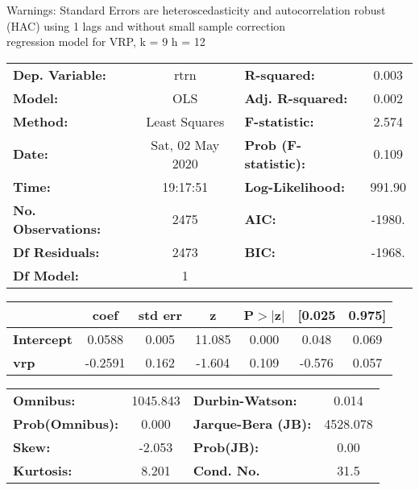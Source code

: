 Warnings: \newline
 [1] Standard Errors are heteroscedasticity and autocorrelation robust (HAC) using 1 lags and without small sample correction\\ 

regression model for VRP, k = 9 h = 12\begin{center}
\begin{tabular}{lclc}
\toprule
\textbf{Dep. Variable:}    &       rtrn       & \textbf{  R-squared:         } &     0.003   \\
\textbf{Model:}            &       OLS        & \textbf{  Adj. R-squared:    } &     0.002   \\
\textbf{Method:}           &  Least Squares   & \textbf{  F-statistic:       } &     2.574   \\
\textbf{Date:}             & Sat, 02 May 2020 & \textbf{  Prob (F-statistic):} &    0.109    \\
\textbf{Time:}             &     19:17:51     & \textbf{  Log-Likelihood:    } &    991.90   \\
\textbf{No. Observations:} &        2475      & \textbf{  AIC:               } &    -1980.   \\
\textbf{Df Residuals:}     &        2473      & \textbf{  BIC:               } &    -1968.   \\
\textbf{Df Model:}         &           1      & \textbf{                     } &             \\
\bottomrule
\end{tabular}
\begin{tabular}{lcccccc}
                   & \textbf{coef} & \textbf{std err} & \textbf{z} & \textbf{P$> |$z$|$} & \textbf{[0.025} & \textbf{0.975]}  \\
\midrule
\textbf{Intercept} &       0.0588  &        0.005     &    11.085  &         0.000        &        0.048    &        0.069     \\
\textbf{vrp}       &      -0.2591  &        0.162     &    -1.604  &         0.109        &       -0.576    &        0.057     \\
\bottomrule
\end{tabular}
\begin{tabular}{lclc}
\textbf{Omnibus:}       & 1045.843 & \textbf{  Durbin-Watson:     } &    0.014  \\
\textbf{Prob(Omnibus):} &   0.000  & \textbf{  Jarque-Bera (JB):  } & 4528.078  \\
\textbf{Skew:}          &  -2.053  & \textbf{  Prob(JB):          } &     0.00  \\
\textbf{Kurtosis:}      &   8.201  & \textbf{  Cond. No.          } &     31.5  \\
\bottomrule
\end{tabular}
\end{center}

